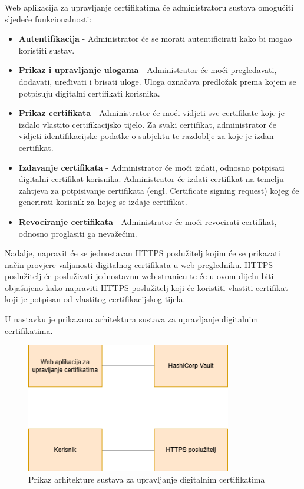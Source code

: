 \documentclass[]{foi}
\begin{document}
Web aplikacija za upravljanje certifikatima će administratoru sustava omogućiti sljedeće funkcionalnosti:
\begin{itemize}
    \item \textbf{Autentifikacija} - Administrator će se morati autentificirati kako bi mogao koristiti sustav.
    \item \textbf{Prikaz i upravljanje ulogama} - Administrator će moći pregledavati, dodavati, uređivati i brisati uloge.
          Uloga označava predložak prema kojem se potpisuju digitalni certifikati korisnika.
    \item \textbf{Prikaz certifikata} - Administrator će moći vidjeti sve certifikate koje je izdalo vlastito certifikacijsko tijelo.
          Za svaki certifikat, administrator će vidjeti identifikacijske podatke o subjektu te razdoblje za koje je izdan certifikat.
    \item \textbf{Izdavanje certifikata} - Administrator će moći izdati, odnosno potpisati digitalni certifikat korisnika.
          Administrator će izdati certifikat na temelju zahtjeva za potpisivanje certifikata (engl. Certificate signing request) kojeg će generirati korisnik za kojeg se izdaje certifikat.
    \item \textbf{Revociranje certifikata} - Administrator će moći revocirati certifikat, odnosno proglasiti ga nevažećim.
\end{itemize}

Nadalje, napravit će se jednostavan HTTPS poslužitelj kojim će se prikazati način provjere valjanosti digitalnog certifikata u web pregledniku.
HTTPS poslužitelj će posluživati jednostavnu web stranicu te će u ovom dijelu biti objašnjeno kako napraviti HTTPS poslužitelj koji će koristiti
vlastiti certifikat koji je potpisan od vlastitog certifikacijskog tijela.

\pagebreak

U nastavku je prikazana arhitektura sustava za upravljanje digitalnim certifikatima.

\begin{figure}[htbp]
    \centering
    \includegraphics[width=0.8\textwidth]{assets/arhitektura.png}
    \caption{Prikaz arhitekture sustava za upravljanje digitalnim certifikatima}
\end{figure}
\end{document}
